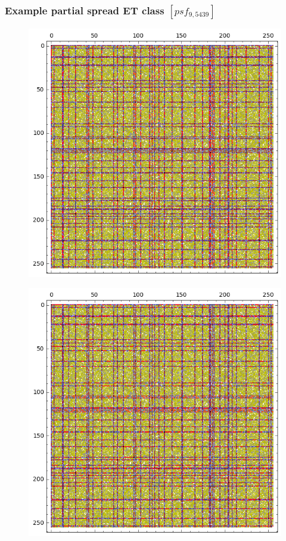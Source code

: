 \documentclass[pdf,sprung,slideColor,nocolorBG]{beamer}
\newenvironment{colortheme}[1]{
\def\ProvidesPackageRCS $##1${\relax}
\renewcommand{\ProcessOptions}{\relax}
\makeatletter

\makeatother
}{}
\begin{document}
\begin{colortheme}{jubata}

\begin{frame}
\frametitle{Example partial spread ET class $[psf_{9,5439}]$}
\begin{figure}
\centering
\begin{minipage}{.48\textwidth}
  \centering
  \includegraphics[width=.9\linewidth]{../matrix_plot/psf_9_5439_bent_cayley_graph_index_matrix.png}
  \label{fig:psf_9_5439_bent_cayley_graph_index_matrix}
\end{minipage}
\begin{minipage}{.48\textwidth}
  \centering
  \includegraphics[width=.9\linewidth]{../matrix_plot/psf_9_5439_dual_cayley_graph_index_matrix.png}

\end{minipage}
\end{figure}
\end{frame}
\end{colortheme}
\end{document}
